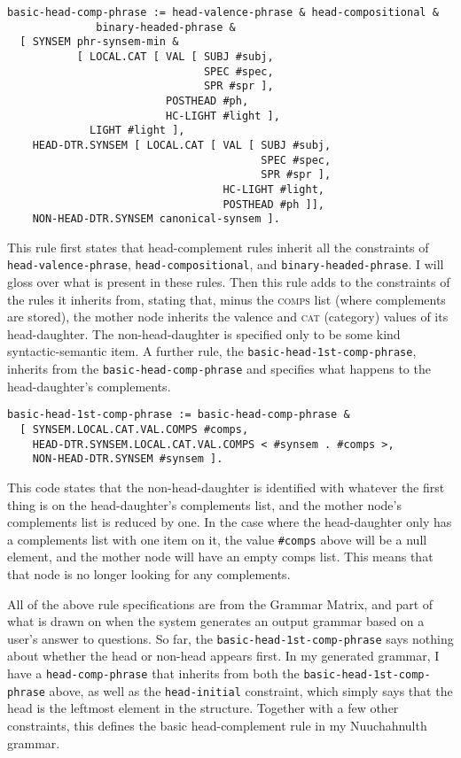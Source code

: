 \begin{verbatim}
basic-head-comp-phrase := head-valence-phrase & head-compositional &
              binary-headed-phrase &
  [ SYNSEM phr-synsem-min &
           [ LOCAL.CAT [ VAL [ SUBJ #subj,
                               SPEC #spec,
                               SPR #spr ],
                         POSTHEAD #ph,
                         HC-LIGHT #light ],
             LIGHT #light ],
    HEAD-DTR.SYNSEM [ LOCAL.CAT [ VAL [ SUBJ #subj,
                                        SPEC #spec,
                                        SPR #spr ],
                                  HC-LIGHT #light,
                                  POSTHEAD #ph ]],
    NON-HEAD-DTR.SYNSEM canonical-synsem ].
\end{verbatim}

This rule first states that head-complement rules inherit all the constraints of \texttt{head-valence-phrase}, \texttt{head-compositional}, and \texttt{binary-headed-phrase}. I will gloss over what is present in these rules. Then this rule adds to the constraints of the rules it inherits from, stating that, minus the \textsc{comps} list (where complements are stored), the mother node inherits the valence and \textsc{cat} (category) values of its head-daughter. The non-head-daughter is specified only to be some kind syntactic-semantic item. A further rule, the \texttt{basic-head-1st-comp-phrase}, inherits from the \texttt{basic-head-comp-phrase} and specifies what happens to the head-daughter's complements.

\begin{verbatim}
basic-head-1st-comp-phrase := basic-head-comp-phrase &
  [ SYNSEM.LOCAL.CAT.VAL.COMPS #comps,
    HEAD-DTR.SYNSEM.LOCAL.CAT.VAL.COMPS < #synsem . #comps >,
    NON-HEAD-DTR.SYNSEM #synsem ].
\end{verbatim}

This code states that the non-head-daughter is identified with whatever the first thing is on the head-daughter's complements list, and the mother node's complements list is reduced by one. In the case where the head-daughter only has a complements list with one item on it, the value \texttt{\#comps} above will be a null element, and the mother node will have an empty comps list. This means that that node is no longer looking for any complements.

All of the above rule specifications are from the Grammar Matrix, and part of what is drawn on when the system generates an output grammar based on a user's answer to questions. So far, the \texttt{\justify basic-head-1st-comp-phrase} says nothing about whether the head or non-head appears first. In my generated grammar, I have a \texttt{head-comp-phrase} that inherits from both the \texttt{\justify basic-head-1st-comp-phrase} above, as well as the \texttt{head-initial} constraint, which simply says that the head is the leftmost element in the structure. Together with a few other constraints, this defines the basic head-complement rule in my Nuuchahnulth grammar.

